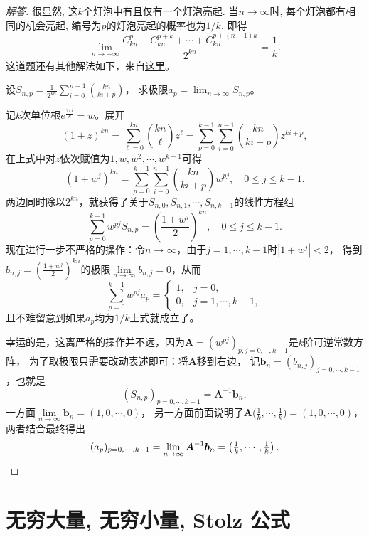 \begin{1b}
\begin{enumerate}
\begin{proof}[解答]
很显然, 这\(k\)个灯泡中有且仅有一个灯泡亮起. 当\(n\rightarrow\infty\)时, 每个灯泡都有相同的机会亮起, 编号为\(p\)的灯泡亮起的概率也为\(1/k\). 即得
\[\lim_{n\rightarrow +\infty}\frac{C_{kn}^{p}+C_{kn}^{p+k}+\cdots+C_{kn}^{p+(n-1)k}}{2^{kn}}=\frac{1}{k}.\]
这道题还有其他解法如下，来自\href{https://mp.weixin.qq.com/s/cyeyDYmMhctg56YVSE4SWQ}{这里}。

设\(S_{n,p}=\frac{1}{2^{kn}}\sum_{i=0}^{n-1}\binom{kn}{ki+p}\)，
求极限\(a_p=\lim_{n\to\infty}S_{n,p}\)。

记$k$次单位根$e^{\frac{2\pi i}{k}}=w$。展开
\[(1+z)^{kn}=\sum_{\ell=0}^{kn}\binom{kn}{\ell}z^{\ell}
=\sum_{p=0}^{k-1}\sum_{i=0}^{n-1}\binom{kn}{ki+p}z^{ki+p},\]
在上式中对$z$依次赋值为$1,w,w^2,\cdots,w^{k-1}$可得
\[(1+w^{j})^{kn}=\sum_{p=0}^{k-1}\sum_{i=0}^{n-1}\binom{kn}{ki+p}w^{pj},\quad0\leqslant j \leqslant k-1.\]
两边同时除以$2^{kn}$，就获得了关于$S_{n,0},S_{n,1},\cdots,S_{n,k-1}$的线性方程组
\[\sum_{p=0}^{k-1}w^{pj}S_{n,p}=\left(\frac{1+w^{j}}{2}\right)^{kn},\quad0\leqslant j \leqslant k-1.\]
现在进行一步不严格的操作：令$n\to\infty$，由于$j=1,\cdots,k-1$时$|1+w^j|<2$，
得到\(b_{n,j}=\left(\frac{1+w^j}{2}\right)^{kn}\)的极限$\lim\limits_{n\to\infty}b_{n,j}=0$，从而
\[\sum_{p=0}^{k-1}w^{pj}a_p=\begin{cases}1,&j=0,\\0,&j=1,\cdots,k-1,\end{cases}\]
且不难留意到如果$a_p$均为$1/k$上式就成立了。

幸运的是，这离严格的操作并不远，因为$\boldsymbol{A}=(w^{pj})_{p,j=0,\cdots,k-1}$是$k$阶可逆常数方阵，
为了取极限只需要改动表述即可：将$\boldsymbol{A}$移到右边，
记$\boldsymbol{b}_n=(b_{n,j})_{j=0,\cdots,k-1}$，也就是
\[(S_{n,p})_{p=0,\cdots,k-1}=\boldsymbol{A}^{-1}\boldsymbol{b}_n,\]
一方面$\lim\limits_{n\to\infty}\boldsymbol{b}_n=(1,0,\cdots,0)$，
另一方面前面说明了$\boldsymbol{A}\big(\frac{1}{k},\cdots,\frac{1}{k}\big)=(1,0,\cdots,0)$，
两者结合最终得出
\[(a_p)_{p=0,\cdots,k-1}=\lim_{n\to\infty}\boldsymbol{A}^{-1}\boldsymbol{b}_n
=\left(\tfrac{1}{k},\cdots,\tfrac{1}{k}\right).\qedhere\]
\end{proof}
\end{enumerate}
\end{1b}
\section{无穷大量, 无穷小量, Stolz 公式}
